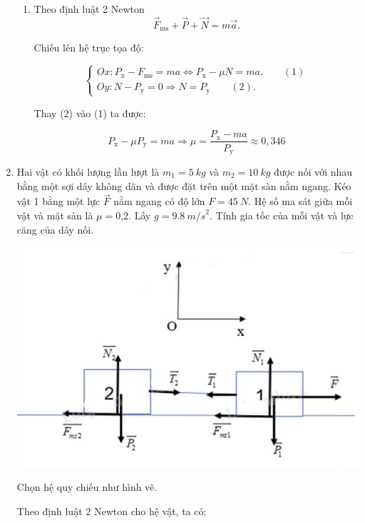\begin{enumerate}[label=\bfseries Bài \arabic*:,leftmargin=1.5cm]
{\begin{enumerate}[label=\alph*)]
		
		\item Theo định luật 2 Newton
		$$\vec F_\text{ms} + \vec P + \vec N = m\vec a.$$
		
		Chiếu lên hệ trục tọa độ:
		
		$$\begin{cases}
			Ox: P_\text{x} - F_\text{ms} =ma \Leftrightarrow  P_\text{x} - \mu N = ma.\qquad (1) \\
			Oy: N - P_\text{y}= 0 \Rightarrow N =P_\text{y}\qquad (2).
			
		\end{cases}$$
		
		Thay (2) vào (1) ta được:
		
		$$ P_\text{x} - \mu P_\text{y} = ma \Rightarrow \mu = \dfrac{ P_\text{x}  -ma}{ P_\text{y}} \approx 0,346 $$
	\end{enumerate}
}

\item {}


{
	Hai vật có khối lượng lần lượt là $m_1 = \SI{5}{kg}$ và $m_2 = \SI{10}{kg}$ được nối với nhau bằng một sợi dây không dãn và được đặt trên một mặt sàn nằm ngang. Kéo vật 1 bằng một lực $\vec F$ nằm ngang có độ lớn $F = \SI{45}{N}$. Hệ số ma sát giữa mỗi vật và mặt sàn là $\mu = \text{0,2}$. Lấy $g = \SI{9,8}{m/s}^2$. Tính gia tốc của mỗi vật và lực căng của dây nối.
}

\hideall
{
	\begin{center}
		\includegraphics[scale=0.8]{../figs/VN10-2022-PH-TP021-13.jpg}
	\end{center}
	
	
	Chọn hệ quy chiếu như hình vẽ.
	
	Theo định luật 2 Newton cho hệ vật, ta có:
	
}
\end{enumerate}
